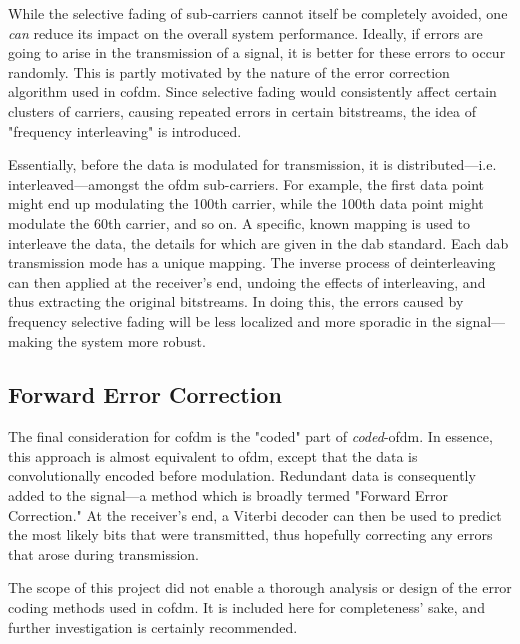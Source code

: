 \documentclass[class=report,11pt,crop=false]{standalone}
\begin{document}
While the selective fading of sub-carriers cannot itself be completely avoided, one \emph{can} reduce its impact on the overall system performance. Ideally, if errors are going to arise in the transmission of a signal, it is better for these errors to occur randomly. This is partly motivated by the nature of the error correction algorithm used in \gls{cofdm}. Since selective fading would consistently affect certain clusters of carriers, causing repeated errors in certain bitstreams, the idea of "frequency interleaving" is introduced.

Essentially, before the data is modulated for transmission, it is distributed---i.e. interleaved---amongst the \gls{ofdm} sub-carriers. For example, the first data point might end up modulating the 100th carrier, while the 100th data point might modulate the 60th carrier, and so on. A specific, known mapping is used to interleave the data, the details for which are given in the \gls{dab} standard. Each \gls{dab} transmission mode has a unique mapping. The inverse process of deinterleaving can then applied at the receiver's end, undoing the effects of interleaving, and thus extracting the original bitstreams. In doing this, the errors caused by frequency selective fading will be less localized and more sporadic in the signal---making the system more robust.

\subsection{Forward Error Correction}
The final consideration for \gls{cofdm} is the "coded" part of \emph{coded}-\gls{ofdm}. In essence, this approach is almost equivalent to \gls{ofdm}, except that the data is convolutionally encoded before modulation. Redundant data is consequently added to the signal---a method which is broadly termed "Forward Error Correction." At the receiver's end, a Viterbi decoder can then be used to predict the most likely bits that were transmitted, thus hopefully correcting any errors that arose during transmission.

The scope of this project did not enable a thorough analysis or design of the error coding methods used in \gls{cofdm}. It is included here for completeness' sake, and further investigation is certainly recommended.

\end{document}
